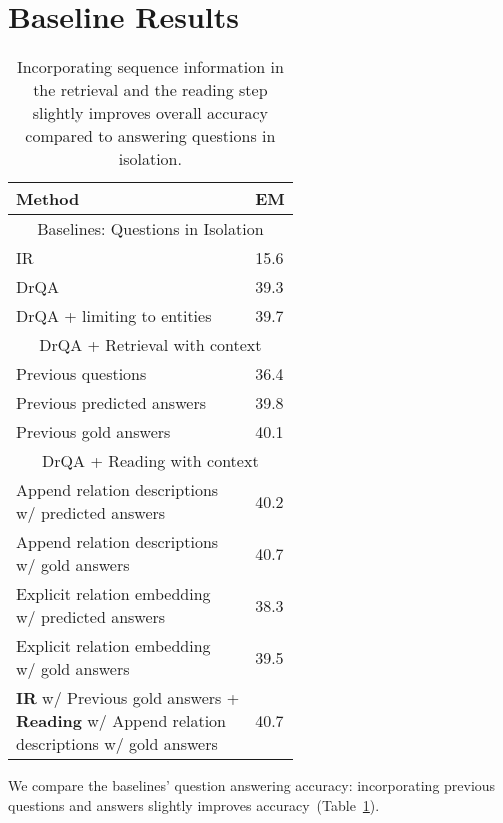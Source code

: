 \section{Baseline Results}

\begin{table}[t!]
\small
\centering
\begin{tabular}{ll}
    \toprule
  \textbf{Method} &  \textbf{EM} \\
  \hline  
    \multicolumn{2}{c}{Baselines: Questions in Isolation}  \\
  \hline
  IR & 15.6 \\
  DrQA & 39.3\\
  DrQA + limiting to entities & 39.7\\
  \hline
    \multicolumn{2}{c}{DrQA + Retrieval with context}  \\
  \hline
  Previous questions & 36.4\\
  Previous predicted answers & 39.8\\
  Previous gold answers & 40.1 \\
  \hline
    \multicolumn{2}{c}{DrQA + Reading with context}  \\
  \hline
   \makecell{Append relation descriptions\\ 
   w/ predicted answers}
 & 40.2 \\
    \makecell{Append relation descriptions\\ 
   w/ gold answers}
 & 40.7 \\
  \makecell{Explicit relation embedding \\
   w/ predicted answers} & 38.3\\
  \makecell{Explicit relation embedding \\
   w/ gold answers} & 39.5\\
  \hline \hline
  \makecell{\textbf{IR} w/ Previous gold answers + \\
  \textbf{Reading} w/ Append relation\\ descriptions
   w/ gold answers}  & 40.7 \\
  \bottomrule
\end{tabular}
\caption{Incorporating sequence information in the
retrieval and the reading step slightly improves 
overall accuracy compared to answering questions in isolation.} 

\label{tab:main_results}
\end{table}


We compare the baselines' question answering accuracy:
incorporating previous questions and answers slightly
improves accuracy~(Table~\ref{tab:main_results}).


